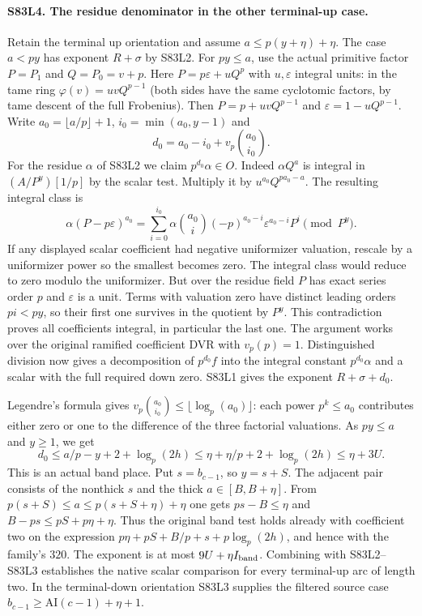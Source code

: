 \paragraph{S83L4. The residue denominator in the other terminal-up case.}
Retain the terminal up orientation and assume $a\le p(y+\eta)+\eta$.
The case $a<py$ has exponent $R+\sigma$ by S83L2. For $py\le a$,
use the actual primitive factor $P=P_1$ and $Q=P_0=v+p$.
Here $P=p\varepsilon+uQ^p$ with $u,\varepsilon$ integral units:
in the tame ring $\varphi(v)=u vQ^{p-1}$ (both sides have the
same cyclotomic factors, by tame descent of the full Frobenius).
Then $P=p+u vQ^{p-1}$ and $\varepsilon=1-uQ^{p-1}$.
Write $a_0=\lfloor a/p\rfloor+1$, $i_0=\min(a_0,y-1)$ and
\[
           d_0=a_0-i_0+v_p\binom{a_0}{i_0}.
\]
For the residue $\alpha$ of S83L2 we claim $p^{d_0}\alpha\in O$.
Indeed $\alpha Q^a$ is integral in $(A/P^y)[1/p]$ by the scalar
test. Multiply it by $u^{a_0}Q^{pa_0-a}$. The resulting integral
class is
\[
   \alpha(P-p\varepsilon)^{a_0}
       =\sum_{i=0}^{i_0}\alpha\binom{a_0}{i}
              (-p)^{a_0-i}\varepsilon^{a_0-i}P^i\pmod {P^y}.
\]
If any displayed scalar coefficient had negative uniformizer
valuation, rescale by a uniformizer power so the smallest becomes
zero. The integral class would reduce to zero modulo the
uniformizer. But over the residue field $P$ has exact series order
$p$ and $\varepsilon$ is a unit. Terms with valuation zero have
distinct leading orders $pi<py$, so their first one survives in the
quotient by $P^y$. This contradiction proves all coefficients
integral, in particular the last one. The argument works over the
original ramified coefficient DVR with $v_p(p)=1$.
Distinguished division now gives a decomposition of $p^{d_0} f$
into the integral constant $p^{d_0}\alpha$ and a scalar with the
full required down zero. S83L1 gives the exponent $R+\sigma+d_0$.

Legendre's formula gives
$v_p\binom{a_0}{i_0}\le\lfloor\log_p(a_0)\rfloor$:
each power $p^k\le a_0$ contributes either zero or one to the
difference of the three factorial valuations. As $py\le a$ and
$y\ge1$, we get
\[
 d_0\le a/p-y+2+\log_p(2h)
      \le\eta+\eta/p+2+\log_p(2h)\le\eta+3U .
\]
This is an actual band place. Put $s=b_{c-1}$, so $y=s+S$.
The adjacent pair consists of the nonthick $s$ and the thick
$a\in[B,B+\eta]$. From $p(s+S)\le a\le p(s+S+\eta)+\eta$
one gets $ps-B\le\eta$ and $B-ps\le pS+p\eta+\eta$.
Thus the original band test holds already with coefficient two
on the expression $p\eta+pS+B/p+s+p\log_p(2h)$, and hence with
the family's $320$. The exponent is at most $9U+\eta I_{\rm band}$.
Combining with S83L2--S83L3 establishes the native scalar comparison
for every terminal-up arc of length two. In the terminal-down
orientation S83L3 supplies the filtered source case $b_{c-1}\ge\mathrm{AI}(c-1)+\eta+1$.
